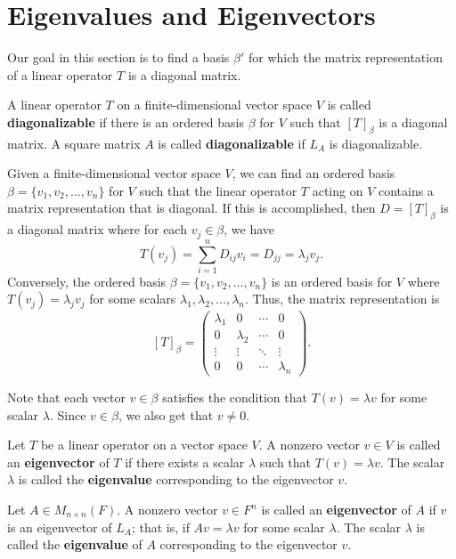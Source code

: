 \section{Eigenvalues and Eigenvectors}

Our goal in this section is to find a basis \( \beta'  \) for which the matrix representation of a linear operator \( T   \) is a diagonal matrix.

\begin{definition}[Diagonalization]
    A linear operator \( T  \) on a finite-dimensional vector space \( V  \) is called \textbf{diagonalizable} if there is an ordered basis \( \beta  \) for \( V  \) such that \( [T]_{\beta} \) is a diagonal matrix. A square matrix \( A  \) is called \textbf{diagonalizable} if \( {L}_{A} \) is diagonalizable.
\end{definition}

Given a finite-dimensional vector space \( V  \), we can find an ordered basis \( \beta = \{ {v}_{1}, {v}_{2}, \dots, {v}_{n} \}  \) for \( V  \) such that the linear operator \( T \) acting on \( V  \) contains a matrix representation that is diagonal. If this is accomplished, then \( D = [T]_{\beta} \) is a diagonal matrix where for each \( {v}_{j} \in \beta \), we have
\[  T({v}_{j}) = \sum_{ i=1 }^{ n } {D}_{ij} {v}_{i} = {D}_{jj} = {\lambda}_{j} {v}_{j}. \]
Conversely, the ordered basis \( \beta = \{ {v}_{1}, {v}_{2}, \dots, {v}_{n} \}   \) is an ordered basis for \( V  \) where \( T({v}_{j}) = {\lambda}_{j} {v}_{j} \) for some scalars \( {\lambda}_{1}, {\lambda}_{2}, \dots, {\lambda}_{n}  \). Thus, the matrix representation is  
\[ [T]_{\beta} = \begin{pmatrix} 
    {\lambda}_{1} & 0 & \cdots & 0 \\ 
    0 & {\lambda}_{2} & \cdots & 0 \\
    \vdots & \vdots & \ddots & \vdots \\
    0 & 0 & \cdots & {\lambda}_{n}
          \end{pmatrix}. \]

Note that each vector \( v \in \beta  \) satisfies the condition that \( T(v) = \lambda v  \) for some scalar \( \lambda \). Since \( v \in \beta  \), we also get that \( v \neq 0  \).

\begin{definition}
    Let \( T  \) be a linear operator on a vector space \( V  \). A nonzero vector \( v \in V  \) is called an \textbf{eigenvector} of \( T  \) if there exists a scalar \( \lambda  \) such that \( T(v) = \lambda v  \). The scalar \( \lambda  \) is called the \textbf{eigenvalue} corresponding to the eigenvector \( v  \). 

    Let \( A \in {M}_{n \times n}(F)  \). A nonzero vector \( v \in F^{n} \) is called an \textbf{eigenvector} of \( A  \) if \( v  \) is an eigenvector of \( {L}_{A} \); that is, if \( Av = \lambda v  \) for some scalar \( \lambda \). The scalar \( \lambda  \) is called the \textbf{eigenvalue} of \( A  \) corresponding to the eigenvector \( v  \).
\end{definition}

